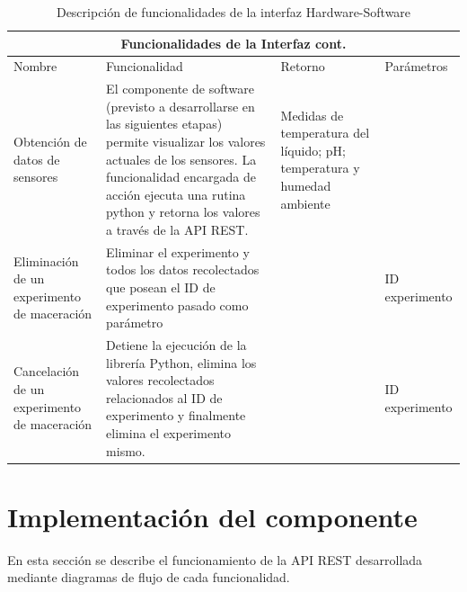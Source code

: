             \begin{table}[H]
                \centering
                \begin{tabularx}{\textwidth}{|X|X|X|X|}
                    \hline
                    \multicolumn{4}{|c|}{\textbf{Funcionalidades de la Interfaz cont.}} \\
                    \hline
                    Nombre & Funcionalidad & Retorno & Parámetros \\ \hline \hline
                    
                    Obtención de datos de sensores & 
                    El componente de software (previsto a desarrollarse en las siguientes etapas) permite visualizar los valores actuales de los sensores. La funcionalidad encargada de acción ejecuta una rutina python y retorna los valores a través de la API REST. & Medidas de temperatura del líquido; pH; temperatura y humedad ambiente & \\
                    \hline
                    
                    Eliminación de un experimento de maceración & Eliminar el experimento y todos los datos recolectados que posean el ID de experimento pasado como parámetro &  & ID experimento\\
                    \hline
                    
                    Cancelación de un experimento de maceración & Detiene la ejecución de la librería Python, elimina los valores recolectados relacionados al ID de experimento y finalmente elimina el experimento mismo. & & ID experimento
                    \\
                    \hline
                    
                \end{tabularx}
                \caption{Descripción de funcionalidades de la interfaz Hardware-Software}
                \label{tab:FuncionalidadesInterfazCont}
            \end{table}

    \section{Implementación del componente}
        \par En esta sección se describe el funcionamiento de la API REST desarrollada mediante diagramas de flujo de cada funcionalidad.
        
